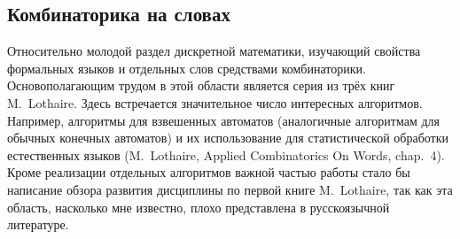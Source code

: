 \documentclass[a4paper,12pt]{article}
\begin{document}
\subsection{Комбинаторика на словах}
Относительно молодой раздел дискретной математики, изучающий свойства формальных языков и отдельных слов средствами комбинаторики. Основополагающим трудом в этой области является серия из трёх книг M.~Lothaire. Здесь встречается значительное число интересных алгоритмов. Например, алгоритмы для взвешенных автоматов (аналогичные алгоритмам для обычных конечных автоматов) и их использование для статистической обработки естественных языков (M.~Lothaire, Applied Combinatorics On Words, chap.~4). Кроме реализации отдельных алгоритмов важной частью работы стало бы написание обзора развития дисциплины по первой книге M.~Lothaire, так как эта область, насколько мне известно, плохо представлена в русскоязычной литературе. 
\end{document}
